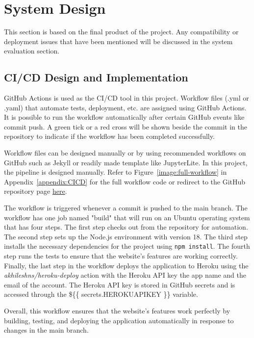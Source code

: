 \chapter{System Design}

This section is based on the final product of the project. Any compatibility or deployment issues that have been mentioned will be discussed in the system evaluation section.

\section{CI/CD Design and Implementation}
GitHub Actions is used as the CI/CD tool in this project. Workflow files (.yml or .yaml) that automate tests, deployment, etc. are assigned using GitHub Actions. It is possible to run the workflow automatically after certain GitHub events like commit push. A green tick or a red cross will be shown beside the commit in the repository to indicate if the workflow has been completed successfully.

Workflow files can be designed manually or by using recommended workflows on GitHub such as Jekyll or readily made template like JupyterLite. In this project, the pipeline is designed manually. Refer to Figure~\ref{image:full-workflow} in Appendix~\ref{appendix:CICD} for the full workflow code or redirect to the GitHub repository page \href{https://github.com/gabhang/final-year-project}{here}.

The workflow is triggered whenever a commit is pushed to the main branch. The workflow has one job named "build" that will run on an Ubuntu operating system that has four steps. The first step checks out from the repository for automation. The second step sets up the Node.js environment with version 18. The third step installs the necessary dependencies for the project using \texttt{npm install}. The fourth step runs the tests to ensure that the website's features are working correctly. Finally, the last step in the workflow deploys the application to Heroku using the \textit{akhileshns/heroku-deploy} action with the Heroku API key the app name and the email of the account. The Heroku API key is stored in GitHub secrets and is accessed through the \$\{\{ secrets.HEROKU\textunderscore API\textunderscore KEY \}\} variable.

Overall, this workflow ensures that the website's features work perfectly by building, testing, and deploying the application automatically in response to changes in the main branch.

